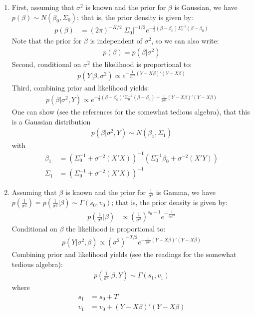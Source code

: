 \begin{enumerate}
\item First, assuming that \(\sigma^2\) is known and the prior for \(\beta \) is Gaussian,
  we have \(p(\beta) \sim N(\beta_0,\Sigma_0)\); that is, the prior density is given by:
\begin{align*} 
p(\beta) &= {(2\pi)}^{-K/2} |\Sigma_0|^{-1/2} e^{-\frac{1}{2} (\beta - \beta_0) \Sigma_0^{-1} (\beta - \beta_0)}
\end{align*}
Note that the prior for \(\beta \) is independent of \(\sigma^2\), so we can also write:
\begin{align*}
p(\beta) = p(\beta|\sigma^2)
\end{align*}
Second, conditional on \(\sigma^2\) the likelihood is proportional to:
\begin{align*}
p(Y|\beta,\sigma^2) \propto e^{-\frac{1}{2\sigma^2} (Y-X\beta)'(Y-X\beta)}
\end{align*}
Third, combining prior and likelihood yields:
\begin{align*}
p(\beta|\sigma^2,Y) \propto e^{-\frac{1}{2} (\beta-\beta_0)' \Sigma_0^{-1} (\beta-\beta_0) - \frac{1}{2\sigma^2} (Y-X\beta)'(Y-X\beta)}
\end{align*}
One can show (see the references for the somewhat tedious algebra), that this is a Gaussian distribution
\begin{align*}
p(\beta|\sigma^2,Y) \sim N(\beta_1,\Sigma_1)
\end{align*}
with
\begin{align*}
\beta_1 &= {\left( \Sigma_0^{-1} + \sigma^{-2} (X'X) \right)}^{-1} \left( \Sigma_0^{-1} \beta_0 + \sigma^{-2} (X'Y) \right)
\\
\Sigma_1 &= {\left( \Sigma_0^{-1} + \sigma^{-2} (X'X) \right)}^{-1}
\end{align*}

\item Assuming that \(\beta \) is known and the prior for \(\frac{1}{\sigma^2}\) is Gamma,
  we have \(p\left(\frac{1}{\sigma^2}\right) = p\left(\frac{1}{\sigma^2}|\beta\right) \sim \Gamma(s_0,v_0)\); that is, the prior density is given by:
\begin{align*}
p\left(\frac{1}{\sigma^2}|\beta\right) & \propto {\left(\frac{1}{\sigma^2} \right)}^{s_0-1} e^{-\frac{1}{v_0\sigma^2}}
\end{align*}
Conditional on \(\beta \) the likelihood is proportional to:
\begin{align*}
p(Y|\sigma^2,\beta) \propto {(\sigma^2)}^{-T/2} e^{-\frac{1}{2\sigma^2} (Y-X\beta)'(Y-X\beta)}
\end{align*}
Combining prior and likelihood yields (see the readings for the somewhat tedious algebra):
\begin{align*}
p\left(\frac{1}{\sigma^2}|\beta,Y\right) \sim \Gamma(s_1,v_1)
\end{align*}
where
\begin{align*}
s_1 &= s_0 + T
\\
v_1 &= v_0 + (Y-X\beta)'(Y-X\beta)
\end{align*}


\end{enumerate}
